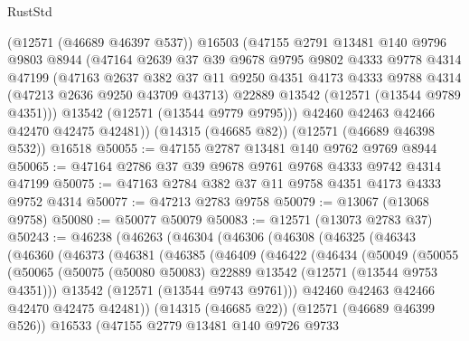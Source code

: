 \begin{lexlean}{RustStd}
\begin{coremodule}
      (@12571 (@46689 @46397 @537))
      @16503
      (@47155
        @2791
        @13481
        @140
        @9796
        @9803
        @8944
        (@47164
          @2639
          @37
          @39
          @9678
          @9795
          @9802
          @4333
          @9778
          @4314
          @47199
          (@47163
            @2637
            @382
            @37
            @11
            @9250
            @4351
            @4173
            @4333
            @9788
            @4314
            (@47213 @2636 @9250 @43709 @43713)
            @22889
            @13542
            (@12571 (@13544 @9789 @4351)))
          @13542
          (@12571 (@13544 @9779 @9795)))
        @42460
        @42463
        @42466
        @42470
        @42475
        @42481))
    (@14315 (@46685 @82))
    (@12571 (@46689 @46398 @532))
    @16518
@50055 := @47155 @2787 @13481 @140 @9762 @9769 @8944
@50065 := @47164 @2786 @37 @39 @9678 @9761 @9768 @4333 @9742 @4314 @47199
@50075 := @47163 @2784 @382 @37 @11 @9758 @4351 @4173 @4333 @9752 @4314
@50077 := @47213 @2783 @9758
@50079 := @13067 (@13068 @9758)
@50080 := @50077 @50079
@50083 := @12571 (@13073 @2783 @37)
@50243 := @46238
    (@46263
      (@46304
        (@46306
          (@46308
            (@46325
              (@46343
                (@46360
                  (@46373
                    (@46381
                      (@46385
                        (@46409
                          (@46422
                            (@46434
                              (@50049
                                (@50055
                                  (@50065
                                    (@50075
                                      (@50080 @50083)
                                      @22889
                                      @13542
                                      (@12571 (@13544 @9753 @4351)))
                                    @13542
                                    (@12571 (@13544 @9743 @9761)))
                                  @42460
                                  @42463
                                  @42466
                                  @42470
                                  @42475
                                  @42481))
                              (@14315 (@46685 @22))
                              (@12571 (@46689 @46399 @526))
                              @16533
                              (@47155
                                @2779
                                @13481
                                @140
                                @9726
                                @9733

\end{coremodule}
\end{lexlean}
